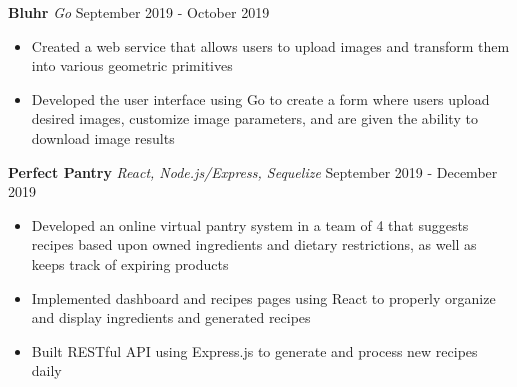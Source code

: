 \documentclass[a4paper]{article}
\newcommand{\lineunder} {
    \vspace*{-8pt} \\
    \hspace*{-18pt} \hrulefill \\
}
\newcommand{\header} [1] {
    {\hspace*{-18pt}\vspace*{6pt} \textsc{#1}}
    \vspace*{-6pt} \lineunder
}
\begin{document}
{\textbf{Bluhr}} {\sl Go} \hfill September 2019 - October 2019\\
\vspace{-3mm}
\begin{itemize} \itemsep -2pt
	\item Created a web service that allows users to upload images and transform them into various geometric primitives
    \item Developed the user interface using Go to create a form where users upload desired images, customize image parameters, and are given the ability to download image results
    
    \end{itemize}
    
{\textbf{Perfect Pantry}} {\sl React, Node.js/Express, Sequelize} \hfill September 2019 - December 2019\\
\vspace{-3mm}
\begin{itemize} \itemsep -2pt
	\item Developed an online virtual pantry system in a team of 4 that suggests recipes based upon owned ingredients and dietary restrictions, as well as keeps track of expiring products
    \item Implemented dashboard and recipes pages using React to properly organize and display ingredients and generated recipes
    \item Built RESTful API using Express.js to generate and process new recipes daily
    \end{itemize}


\end{document}
